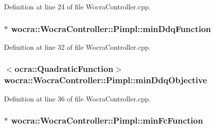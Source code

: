 Definition at line 24 of file Wocra\+Controller.\+cpp.

\subsubsection[{\texorpdfstring{min\+Ddq\+Function}{minDdqFunction}}]{$\ast$ wocra\+::\+Wocra\+Controller\+::\+Pimpl\+::min\+Ddq\+Function}\hypertarget{structwocra_1_1WocraController_1_1Pimpl_aac1952b2ca7547f82d807089baa98f10}{}\label{structwocra_1_1WocraController_1_1Pimpl_aac1952b2ca7547f82d807089baa98f10}


Definition at line 32 of file Wocra\+Controller.\+cpp.

\subsubsection[{\texorpdfstring{min\+Ddq\+Objective}{minDdqObjective}}]{$<${\bf ocra\+::\+Quadratic\+Function}$>$ wocra\+::\+Wocra\+Controller\+::\+Pimpl\+::min\+Ddq\+Objective}\hypertarget{structwocra_1_1WocraController_1_1Pimpl_a7fc80a10628bf0361a7c44d5bb659742}{}\label{structwocra_1_1WocraController_1_1Pimpl_a7fc80a10628bf0361a7c44d5bb659742}


Definition at line 36 of file Wocra\+Controller.\+cpp.

\subsubsection[{\texorpdfstring{min\+Fc\+Function}{minFcFunction}}]{$\ast$ wocra\+::\+Wocra\+Controller\+::\+Pimpl\+::min\+Fc\+Function}\hypertarget{structwocra_1_1WocraController_1_1Pimpl_af1d4d6700f771ae7c2bf129b7cb1fd06}{}\label{structwocra_1_1WocraController_1_1Pimpl_af1d4d6700f771ae7c2bf129b7cb1fd06}


